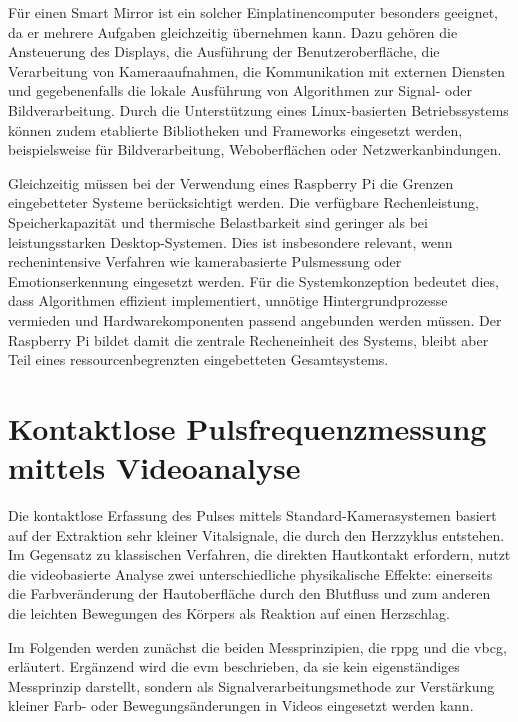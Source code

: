 Für einen Smart Mirror ist ein solcher Einplatinencomputer besonders geeignet, da er mehrere Aufgaben gleichzeitig übernehmen kann. Dazu gehören die Ansteuerung des Displays, die Ausführung der Benutzeroberfläche, die Verarbeitung von Kameraaufnahmen, die Kommunikation mit externen Diensten und gegebenenfalls die lokale Ausführung von Algorithmen zur Signal- oder Bildverarbeitung. Durch die Unterstützung eines Linux-basierten Betriebssystems können zudem etablierte Bibliotheken und Frameworks eingesetzt werden, beispielsweise für Bildverarbeitung, Weboberflächen oder Netzwerkanbindungen.

Gleichzeitig müssen bei der Verwendung eines Raspberry Pi die Grenzen eingebetteter Systeme berücksichtigt werden. Die verfügbare Rechenleistung, Speicherkapazität und thermische Belastbarkeit sind geringer als bei leistungsstarken Desktop-Systemen. Dies ist insbesondere relevant, wenn rechenintensive Verfahren wie kamerabasierte Pulsmessung oder Emotionserkennung eingesetzt werden. Für die Systemkonzeption bedeutet dies, dass Algorithmen effizient implementiert, unnötige Hintergrundprozesse vermieden und Hardwarekomponenten passend angebunden werden müssen. Der Raspberry Pi bildet damit die zentrale Recheneinheit des Systems, bleibt aber Teil eines ressourcenbegrenzten eingebetteten Gesamtsystems.


\section{Kontaktlose Pulsfrequenzmessung mittels Videoanalyse}

Die kontaktlose Erfassung des Pulses mittels Standard-Kamerasystemen basiert auf der Extraktion sehr kleiner Vitalsignale, die durch den Herzzyklus entstehen. Im Gegensatz zu klassischen Verfahren, die direkten Hautkontakt erfordern, nutzt die videobasierte Analyse zwei unterschiedliche physikalische Effekte: einerseits die Farbveränderung der Hautoberfläche durch den Blutfluss und zum anderen die leichten Bewegungen des Körpers als Reaktion auf einen Herzschlag.

Im Folgenden werden zunächst die beiden Messprinzipien, die \ac{rppg} und die \ac{vbcg}, erläutert. Ergänzend wird die \ac{evm} beschrieben, da sie kein eigenständiges Messprinzip darstellt, sondern als Signalverarbeitungsmethode zur Verstärkung kleiner Farb- oder Bewegungsänderungen in Videos eingesetzt werden kann.

